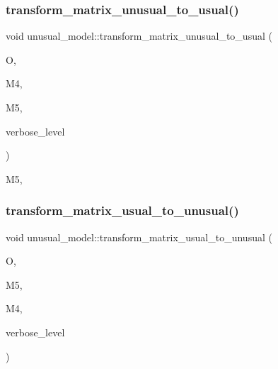 \subsubsection{\texorpdfstring{transform\+\_\+matrix\+\_\+unusual\+\_\+to\+\_\+usual()}{transform\_matrix\_unusual\_to\_usual()}}
{\footnotesize\ttfamily void unusual\+\_\+model\+::transform\+\_\+matrix\+\_\+unusual\+\_\+to\+\_\+usual (\begin{DoxyParamCaption}\item[{\mbox{\hyperlink{classorthogonal}{orthogonal}} $\ast$}]{O,  }\item[{\mbox{\hyperlink{galois_8h_a09fddde158a3a20bd2dcadb609de11dc}{I\+NT}} $\ast$}]{M4,  }\item[{\mbox{\hyperlink{galois_8h_a09fddde158a3a20bd2dcadb609de11dc}{I\+NT}} $\ast$}]{M5,  }\item[{\mbox{\hyperlink{galois_8h_a09fddde158a3a20bd2dcadb609de11dc}{I\+NT}}}]{verbose\+\_\+level }\end{DoxyParamCaption})}

M5, \mbox{\label{classunusual__model_a1e95d4e22c662385e061f289235bcb90}} 
\subsubsection{\texorpdfstring{transform\+\_\+matrix\+\_\+usual\+\_\+to\+\_\+unusual()}{transform\_matrix\_usual\_to\_unusual()}}
{\footnotesize\ttfamily void unusual\+\_\+model\+::transform\+\_\+matrix\+\_\+usual\+\_\+to\+\_\+unusual (\begin{DoxyParamCaption}\item[{\mbox{\hyperlink{classorthogonal}{orthogonal}} $\ast$}]{O,  }\item[{\mbox{\hyperlink{galois_8h_a09fddde158a3a20bd2dcadb609de11dc}{I\+NT}} $\ast$}]{M5,  }\item[{\mbox{\hyperlink{galois_8h_a09fddde158a3a20bd2dcadb609de11dc}{I\+NT}} $\ast$}]{M4,  }\item[{\mbox{\hyperlink{galois_8h_a09fddde158a3a20bd2dcadb609de11dc}{I\+NT}}}]{verbose\+\_\+level }\end{DoxyParamCaption})}



